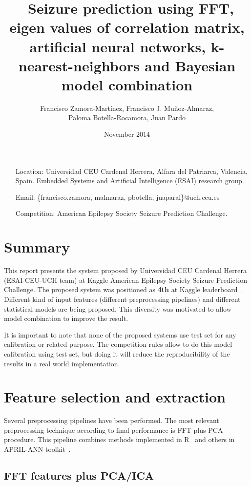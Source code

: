 \documentclass[a4paper,english,twoside]{article}
\author{Francisco Zamora-Martínez, Francisco J. Muñoz-Almaraz,\\
  Paloma Botella-Rocamora, Juan Pardo}
\date{November 2014}
\title{\ Seizure prediction using FFT, eigen values of correlation matrix,
  artificial neural networks, k-nearest-neighbors and Bayesian model combination}
\begin{document}
\maketitle

\begin{itemize}
\item[Location:] Universidad CEU Cardenal Herrera, Alfara del Patriarca,
  Valencia, Spain. Embedded Systems and Artificial Intelligence (ESAI) research
  group.
\item[Email:] \{francisco.zamora, malmaraz, pbotella, juaparal\}@uch.ceu.es
\item[Competition:] American Epilepsy Society Seizure Prediction Challenge.
\end{itemize}

\section{Summary}\label{summary}

This report presents the system proposed by Universidad CEU Cardenal Herrera
(ESAI-CEU-UCH team) at Kaggle American Epilepsy Society Seizure Prediction
Challenge. The proposed system was positioned as \textbf{4th} at Kaggle
leaderboard~\cite{kaggle}. Different kind of input features (different
preprocessing pipelines) and different statistical models are being
proposed. This diversity was motivated to allow model combination to improve the
result.

It is important to note that none of the proposed systems use test set
for any calibration or related purpose. The competition rules allow to do this
model calibration using test set, but doing it will reduce the
reproducibility of the results in a real world implementation.

\section{Feature selection and
  extraction}\label{feature-selection-and-extraction}

Several preprocessing pipelines have been performed. The most relevant
preprocessing technique according to final performance is FFT plus PCA
procedure. This pipeline combines methods implemented in R~\cite{Rproject} and
others in APRIL-ANN toolkit~\cite{aprilann}.

\subsection{FFT features plus PCA/ICA}\label{fft-features-plus-pcaica}
\end{document}
